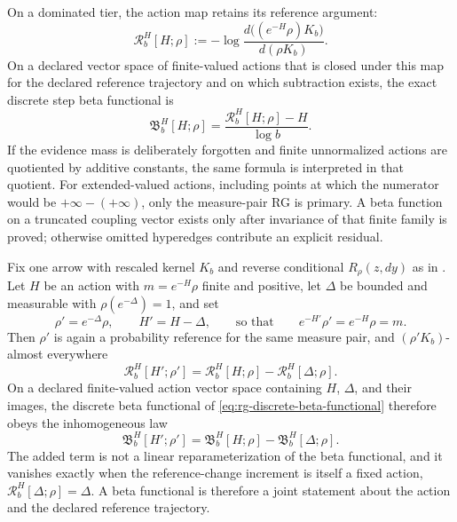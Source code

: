On a dominated tier, the action map retains its reference argument:
\begin{equation}
\mathcal R_b^H[H;\rho]
:=-\log\frac{d\bigl((e^{-H}\rho)K_b\bigr)}
{d(\rho K_b)}.
\label{eq:rg-reference-dependent-action-map}
\end{equation}
On a declared vector space of finite-valued actions that is closed under this
map for the declared reference trajectory and on which subtraction exists, the
exact discrete step beta functional is
\begin{equation}
\mathfrak B_b^H[H;\rho]
=\frac{\mathcal R_b^H[H;\rho]-H}{\log b}.
\label{eq:rg-discrete-beta-functional}
\end{equation}
If the evidence mass is deliberately forgotten and finite unnormalized actions
are quotiented by additive constants, the same formula is interpreted in that
quotient.  For extended-valued actions, including points at which the
numerator would be $+\infty-(+\infty)$, only the measure-pair RG is primary.  A beta
function on a truncated coupling vector exists only after invariance of that
finite family is proved; otherwise omitted hyperedges contribute an explicit
residual.  

Fix one arrow with rescaled kernel $K_b$ and reverse conditional
$R_\rho(z,dy)$ as in .  Let $H$ be an action with
$m=e^{-H}\rho$ finite and positive, let $\Delta$ be bounded and measurable with
$\rho(e^{-\Delta})=1$, and set
\begin{equation}
\rho'=e^{-\Delta}\rho,
\qquad
H'=H-\Delta,
\qquad\text{so that}\qquad
e^{-H'}\rho'=e^{-H}\rho=m.
\label{eq:rg-reference-change-pair}
\end{equation}
Then $\rho'$ is again a probability reference for the same measure pair, and
$(\rho'K_b)$-almost everywhere
\begin{equation}
\mathcal R_b^H[H';\rho']
=\mathcal R_b^H[H;\rho]-\mathcal R_b^H[\Delta;\rho].
\label{eq:rg-action-reference-change}
\end{equation}
On a declared finite-valued action vector space containing $H$, $\Delta$, and
their images, the discrete beta functional of
\eqref{eq:rg-discrete-beta-functional} therefore obeys the inhomogeneous law
\begin{equation}
\mathfrak B_b^H[H';\rho']
=\mathfrak B_b^H[H;\rho]-\mathfrak B_b^H[\Delta;\rho].
\label{eq:rg-beta-reference-change}
\end{equation}
The added term is not a linear reparameterization of the beta functional, and it
vanishes exactly when the reference-change increment is itself a fixed action,
$\mathcal R_b^H[\Delta;\rho]=\Delta$.  A beta functional is therefore a joint
statement about the action and the declared reference trajectory.

